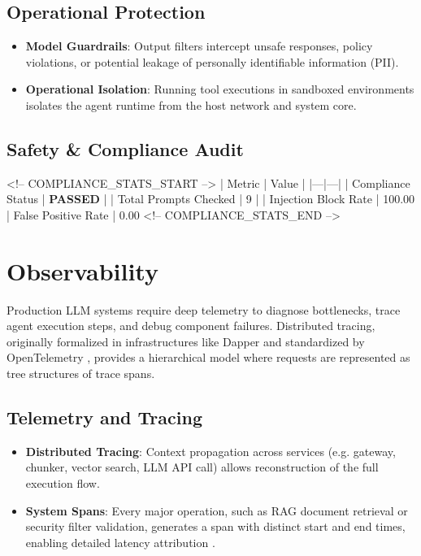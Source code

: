 \documentclass[11pt]{article}
\begin{document}
\subsection{Operational Protection}

\begin{itemize}
  \item \textbf{Model Guardrails}: Output filters intercept unsafe responses, policy violations, or potential leakage of personally identifiable information (PII).
  \item \textbf{Operational Isolation}: Running tool executions in sandboxed environments isolates the agent runtime from the host network and system core.
\end{itemize}

\subsection{Safety & Compliance Audit}

<!-- COMPLIANCE_STATS_START -->
| Metric | Value |
|---|---|
| Compliance Status | \textbf{PASSED} |
| Total Prompts Checked | 9 |
| Injection Block Rate | 100.00%
| False Positive Rate | 0.00%
<!-- COMPLIANCE_STATS_END -->

\section{Observability}

Production LLM systems require deep telemetry to diagnose bottlenecks, trace agent execution steps, and debug component failures. Distributed tracing, originally formalized in infrastructures like Dapper \cite{source-dapper-2010} and standardized by OpenTelemetry \cite{source-opentelemetry-2023}, provides a hierarchical model where requests are represented as tree structures of trace spans.

\subsection{Telemetry and Tracing}

\begin{itemize}
  \item \textbf{Distributed Tracing}: Context propagation across services (e.g. gateway, chunker, vector search, LLM API call) allows reconstruction of the full execution flow.
  \item \textbf{System Spans}: Every major operation, such as RAG document retrieval or security filter validation, generates a span with distinct start and end times, enabling detailed latency attribution \cite{source-llm-agent-tracing-2024}.
\end{itemize}
\end{document}
